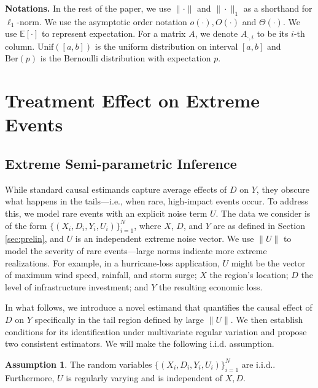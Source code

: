 \documentclass[12pt]{article}
\theoremstyle{plain}
\theoremstyle{definition}
\newtheorem{assumption}[theorem]{Assumption}
\newcommand{\tmstrong}[1]{\textbf{#1}}
\begin{document}
{\tmstrong{Notations.}} In the rest of the paper, we use $\| \cdot \|$ and $\| \cdot \|_1$ as a shorthand for $\ell_1$-norm. We use the asymptotic order notation $o (\cdot), O (\cdot)$ and $\Theta (\cdot)$. We use $\mathbb{E}[\cdot]$ to represent expectation. For a matrix $A$, we denote $A_{\cdot,i}$ to be its $i$-th column. $\text{Unif}([a,b])$ is the uniform distribution on interval $[a,b]$ and $\text{Ber}(p)$ is the Bernoulli distribution with expectation $p$.    

\section{Treatment Effect on Extreme Events}\label{sec:main}
\subsection{Extreme Semi-parametric Inference}

While standard causal estimands capture average effects of $D$ on $Y$, they obscure what happens in the tails—i.e., when rare, high‐impact events occur.  To address this, we model rare events with an explicit noise term $U$. The data we consider is of the form $\{(X_i, D_i, Y_i, U_i)\}_{i = 1}^N$, where $X$, $D$, and $Y$ are as defined in Section \ref{sec:prelin}, and $U$ is an independent extreme noise vector.  We use $\|U\|$ to model the severity of rare events—large norms indicate more extreme realizations.  For example, in a hurricane‐loss application, $U$ might be the vector of maximum wind speed, rainfall, and storm surge; $X$ the region’s location; $D$ the level of infrastructure investment; and $Y$ the resulting economic loss.

In what follows, we introduce a novel estimand that quantifies the causal effect of $D$ on $Y$ specifically in the tail region defined by large $\|U\|$.  We then establish conditions for its identification under multivariate regular variation and propose two consistent estimators. We will make the following i.i.d. assumption. 
\begin{assumption}
  \label{assump:iid}
  The random variables $\{(X_i, D_i, Y_i, U_i)\}_{i = 1}^N$ are i.i.d.. Furthermore, $U$ is regularly varying and is independent of $X, D$. 
\end{assumption}
\end{document}
